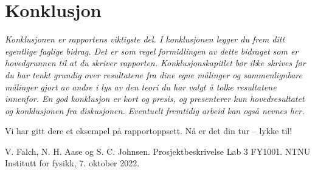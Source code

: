 \documentclass[5p]{elsarticle}
\begin{document}

\section{Konklusjon}
\textit{
Konklusjonen er rapportens viktigste del. I konklusjonen legger du frem ditt egentlige faglige bidrag. Det er som regel formidlingen av dette bidraget som er hovedgrunnen til at du skriver rapporten. Konklusjonskapitlet bør ikke skrives før du har tenkt grundig over resultatene fra dine egne målinger og sammenlignbare målinger gjort av andre i lys av den teori du har valgt å tolke resultatene innenfor. En god konklusjon er kort og presis, og presenterer kun hovedresultatet og konklusjonen fra diskusjonen. Eventuelt fremtidig arbeid kan også nevnes her. 
}

Vi har gitt dere et eksempel på rapportoppsett. Nå er det din tur -- lykke til!


\begin{thebibliography}{99}	%

V. Falch, N. H. Aase og S. C. Johnsen. Prosjektbeskrivelse Lab 3 FY1001. NTNU Institutt for fysikk, 7. oktober 2022.

\end{thebibliography}
\end{document}
